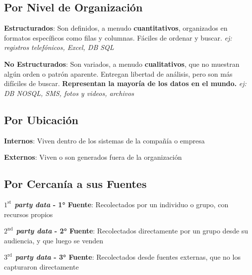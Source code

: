 \subsection{Por Nivel de Organización}
\begin{description}
    \item {\textbf{Estructurados}: Son definidos, a menudo \textbf{cuantitativos}, organizados en formatos específicos como filas y columnas. Fáciles de ordenar y buscar. \textit{ej: registros telefónicos, Excel, DB SQL}}
    \item {\textbf{No Estructurados}: Son variados, a menudo \textbf{cualitativos}, que no muestran algún orden o patrón aparente. Entregan libertad de análisis, pero son más difíciles de buscar. \textbf{Representan la mayoría de los datos en el mundo.} \textit{ej: DB NOSQL, SMS, fotos y videos, archivos}}
\end{description}

\subsection{Por Ubicación}
\begin{description}
    \item {\textbf{Internos}: Viven dentro de los sistemas de la compañía o empresa}
    \item {\textbf{Externos}: Viven o son generados fuera de la organización}
\end{description}

\subsection{Por Cercanía a sus Fuentes}
\begin{description}
    \item {\textbf{\textit{$1^{\text{st}}$ party data} - 1° Fuente}: Recolectados por un individuo o grupo, con recursos propios}
    \item {\textbf{\textit{$2^{\text{nd}}$ party data} - 2° Fuente}: Recolectados directamente por un grupo desde su audiencia, y que luego se venden}
    \item {\textbf{\textit{$3^{\text{rd}}$ party data} - 3° Fuente}: Recolectados desde fuentes externas, que no los capturaron directamente}
\end{description}

